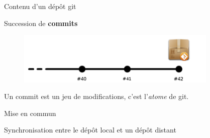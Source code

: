 \documentclass{beamer}
\begin{document}
\begin{frame}{Contenu d'un dépôt git}
	\begin{center}
		Succession de \textbf{commits}\\
	\end{center}
	\begin{figure}
		\centering
		\includegraphics[height=2.5cm]{img/repo1}
	\end{figure}
	Un commit est un jeu de modifications, c'est l'\textit{atome} de git.
\end{frame}


\begin{frame}{Mise en commun}
	\begin{center}
		Synchronisation entre le dépôt local et un dépôt distant
	\end{center}
	
	\begin{figure}
  		\centering
	\end{figure}
\end{frame}
\end{document}
